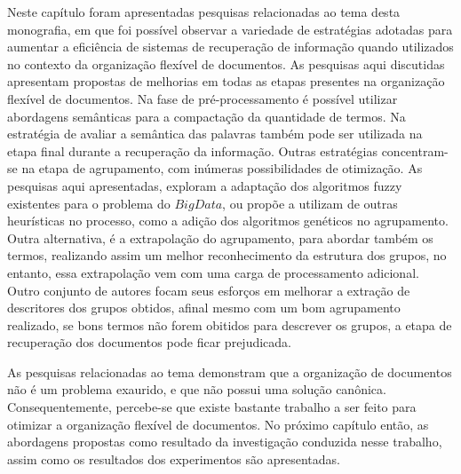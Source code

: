 Neste capítulo foram apresentadas pesquisas relacionadas ao tema desta monografia, em que foi possível
observar a variedade de estratégias adotadas para aumentar a eficiência de sistemas de recuperação
de informação quando utilizados no contexto da organização flexível de documentos. As pesquisas aqui
discutidas apresentam propostas de melhorias em todas as etapas presentes na 
organização flexível de
documentos. Na fase de pré-processamento é possível utilizar abordagens semânticas para
a compactação da quantidade de termos. Na estratégia de avaliar a semântica das palavras também
pode ser utilizada na etapa final durante a recuperação da informação. Outras 
estratégias concentram-se na etapa de agrupamento, com inúmeras possibilidades de otimização. As
pesquisas aqui apresentadas, exploram a adaptação dos algoritmos fuzzy existentes para o problema do
$Big Data$, ou propõe a utilizam de outras heurísticas no processo, como a adição dos algoritmos
genéticos no agrupamento. Outra alternativa, é a extrapolação do agrupamento, para abordar também os
termos, realizando assim um melhor reconhecimento da estrutura dos grupos, no entanto, essa
extrapolação vem com uma carga de processamento adicional. Outro conjunto de autores focam seus
esforços em melhorar a extração de descritores dos grupos obtidos, afinal mesmo com um bom
agrupamento realizado, se bons termos não forem obitidos para descrever os grupos, a etapa de
recuperação dos documentos pode ficar prejudicada.

As pesquisas relacionadas ao tema demonstram que a organização de documentos não é um
problema exaurido, e que não possui uma solução canônica. Consequentemente, percebe-se que
existe bastante trabalho a ser feito para otimizar a organização flexível de documentos. No próximo
capítulo então, as abordagens propostas como resultado da investigação conduzida nesse
trabalho, assim como os resultados dos experimentos são apresentadas.
